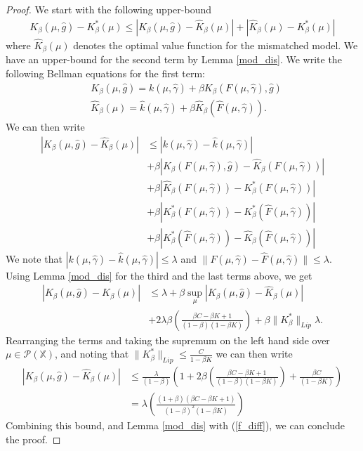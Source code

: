 \documentclass[twoside,11pt]{article}
\def\P{{\mathcal P}}
\begin{document}
\begin{proof}
We start with the following upper-bound
\begin{align}\label{f_diff}
K_\beta(\mu,\hat{g}) - K_\beta^*(\mu)\leq \left| K_\beta(\mu,\hat{g})  - \hat{K}_\beta(\mu)\right| + \left|\hat{K}_\beta(\mu) -  K_\beta^*(\mu)\right|
\end{align}
where $\hat{K}_\beta(\mu)$ denotes the optimal value function for the mismatched model.  We have an upper-bound for the second term by Lemma \ref{mod_dis}. We write the following Bellman equations for the first term:
\begin{align*}
&K_\beta(\mu,\hat{g}) = k(\mu,\hat{\gamma}) + \beta K_\beta\left( F(\mu,\hat{\gamma}) , \hat{g}  \right)\\
&\hat{K}_\beta(\mu) = \hat{k}(\mu,\hat{\gamma}) + \beta \hat{K}_\beta\left( \hat{F}(\mu,\hat{\gamma})  \right).
\end{align*}
We can then write 
\begin{align*}
\left| K_\beta(\mu,\hat{g})  - \hat{K}_\beta(\mu)\right| &\leq \left|  k(\mu,\hat{\gamma}) - \hat{k}(\mu,\hat{\gamma})\right|\\
& + \beta\left|  K_\beta\left( F(\mu,\hat{\gamma}) , \hat{g}  \right) - \hat{K}_\beta\left( F(\mu,\hat{\gamma})\right)\right|\\
& + \beta \left|  \hat{K}_\beta\left( F(\mu,\hat{\gamma})\right) -  {K}^*_\beta\left( F(\mu,\hat{\gamma})\right)\right|\\
&+ \beta \left|   {K}^*_\beta\left( F(\mu,\hat{\gamma})\right) - K_\beta^*(\hat{F}(\mu,\hat{\gamma}) )\right|\\
& + \beta \left|  K_\beta^*(\hat{F}(\mu,\hat{\gamma}) ) - \hat{K}_\beta\left( \hat{F}(\mu,\hat{\gamma})  \right)\right|
\end{align*}
We note that $ \left|  k(\mu,\hat{\gamma}) - \hat{k}(\mu,\hat{\gamma})\right| \leq \lambda$ and $ \|F(\mu,\hat{\gamma}) - \hat{F}(\mu,\hat{\gamma}) \| \leq \lambda$. Using Lemma \ref{mod_dis} for the third and the last terms above, we get
\begin{align*}
\left| K_\beta(\mu,\hat{g})  - \hat{K}_\beta(\mu)\right| &\leq \lambda + \beta \sup_\mu \left| K_\beta(\mu,\hat{g})  - \hat{K}_\beta(\mu)\right| \\
& +  2\lambda \beta\left( \frac{\beta C- \beta K +1}{(1-\beta)(1-\beta K)}  \right) + \beta \|K_\beta^*\|_{Lip} \lambda.
\end{align*}
Rearranging the terms and taking the supremum on the left hand side over $\mu\in\P(\mathds{X})$,  and noting that $\|K_\beta^*\|_{Lip} \leq \frac{C}{1-\beta K}$ we can then write
\begin{align*}
\left| K_\beta(\mu,\hat{g})  - \hat{K}_\beta(\mu)\right| &\leq \frac{\lambda}{(1-\beta)}\left(1 +   2\beta\left( \frac{\beta C- \beta K +1}{(1-\beta)(1-\beta K) }\right)   + \frac{\beta C}{(1-\beta K)}  \right) \\
& = \lambda \left( \frac{(1+\beta)(\beta C - \beta K +1)}{(1-\beta)^2 (1-\beta K)}  \right)
\end{align*}
Combining this bound, and Lemma \ref{mod_dis} with (\ref{f_diff}), we can conclude the proof.


\end{proof}
\end{document}
